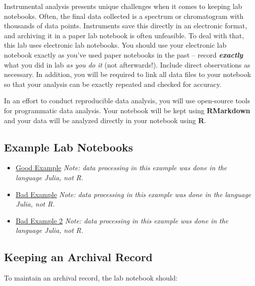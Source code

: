 \documentclass[]{tufte-book}
\providecommand{\tightlist}{%
  \setlength{\itemsep}{0pt}\setlength{\parskip}{0pt}}
\begin{document}
Instrumental analysis presents unique challenges when it comes to keeping lab notebooks. Often, the final data collected is a spectrum or chromatogram with thousands of data points. Instruments save this directly in an electronic format, and archiving it in a paper lab notebook is often unfeasible. To deal with that, this lab uses electronic lab notebooks. You should use your electronic lab notebook exactly as you've used paper notebooks in the past -- record \textbf{\emph{exactly}} what you did in lab \emph{as you do it} (not afterwards!). Include direct observations as necessary. In addition, you will be required to link all data files to your notebook so that your analysis can be exactly repeated and checked for accuracy.

In an effort to conduct reproducible data analysis, you will use open-source tools for programmatic data analysis. Your notebook will be kept using \textbf{RMarkdown} and your data will be analyzed directly in your notebook using \textbf{R}.

\hypertarget{example-lab-notebooks}{%
\subsection*{Example Lab Notebooks}\label{example-lab-notebooks}}

\begin{itemize}
\tightlist
\item
  \href{../notebooks/good-example/}{Good Example} \emph{Note: data processing in this example was done in the language Julia, not R.}\\
\item
  \href{../notebooks/bad-example/}{Bad Example} \emph{Note: data processing in this example was done in the language Julia, not R.}\\
\item
  \href{../notebooks/bad-example-2/}{Bad Example 2} \emph{Note: data processing in this example was done in the language Julia, not R.}
\end{itemize}

\hypertarget{keeping-an-archival-record}{%
\subsection*{Keeping an Archival Record}\label{keeping-an-archival-record}}

To maintain an archival record, the lab notebook should:
\end{document}
